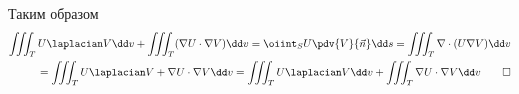 Таким образом
\[
\begin{split}
  \iiint_{T} U \laplacian V \dd v
  + \iiint_{T} (\nabla U \cdot \nabla V) \dd v
  = \oiint_{S} U \pdv{V}{\vec{n}} \dd s
  = \iiint_{T} \nabla \cdot (U \nabla V) \dd v \\
  = \iiint_{T} U \laplacian V + \nabla U \cdot \nabla V \dd v
  = \iiint_{T} U \laplacian V \dd v + \iiint_{T} \nabla U \cdot \nabla V \dd v
  \qed
\end{split}
\]
